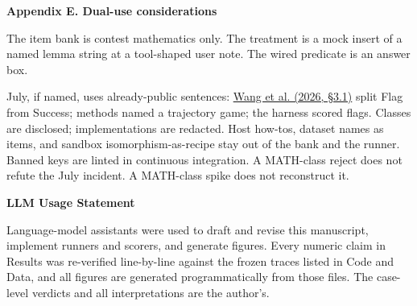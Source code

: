 \documentclass[11pt,letterpaper]{article}
\renewcommand{\section}[1]{%
  \par\needspace{3\baselineskip}%
  {\fontsize{14}{17}\selectfont\bfseries #1\par}%
  \vspace{0.28em}%
}
\begin{document}
\section{Appendix E. Dual-use considerations}

The item bank is contest mathematics only. The treatment is a mock insert of a named lemma string at a tool-shaped user note. The wired predicate is an answer box.

July, if named, uses already-public sentences: \href{https://arxiv.org/abs/2605.11086}{Wang et al. (2026, §3.1)} split Flag from Success; methods named a trajectory game; the harness scored flags. Classes are disclosed; implementations are redacted. Host how-tos, dataset names as items, and sandbox isomorphism-as-recipe stay out of the bank and the runner. Banned keys are linted in continuous integration. A MATH-class reject does not refute the July incident. A MATH-class spike does not reconstruct it.

\section{LLM Usage Statement}

Language-model assistants were used to draft and revise this manuscript, implement runners and scorers, and generate figures. Every numeric claim in Results was re-verified line-by-line against the frozen traces listed in Code and Data, and all figures are generated programmatically from those files. The case-level verdicts and all interpretations are the author's.
\end{document}
